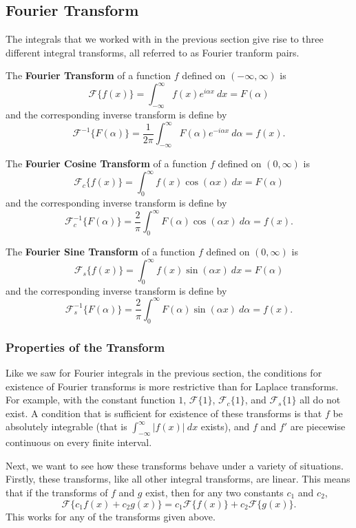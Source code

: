 \subsection{Fourier Transform}

The integrals that we worked with in the previous section give rise to three different integral transforms, all referred to as Fourier tranform pairs. 

\begin{definition}
The \textbf{Fourier Transform} of a function $f$ defined on $(-\infty, \infty)$ is
\[ \mathcal{F}\{f(x)\} = \int_{-\infty}^\infty f(x)e^{i\alpha x}\ dx = F(\alpha) \] and the corresponding inverse transform is define by 
\[ \mathcal{F}^{-1}\{F(\alpha)\} = \frac{1}{2\pi} \int_{-\infty}^\infty F(\alpha)e^{-i\alpha x}\ d\alpha = f(x). \]

The \textbf{Fourier Cosine Transform} of a function $f$ defined on $(0, \infty)$ is
\[ \mathcal{F}_c\{f(x)\} = \int_{0}^\infty f(x)\cos(\alpha x)\ dx = F(\alpha) \] and the corresponding inverse transform is define by 
\[ \mathcal{F}_c^{-1}\{F(\alpha)\} = \frac{2}{\pi} \int_{0}^\infty F(\alpha)\cos(\alpha x)\ d\alpha = f(x). \]

The \textbf{Fourier Sine Transform} of a function $f$ defined on $(0, \infty)$ is
\[ \mathcal{F}_s\{f(x)\} = \int_{0}^\infty f(x)\sin(\alpha x)\ dx = F(\alpha) \] and the corresponding inverse transform is define by 
\[ \mathcal{F}_s^{-1}\{F(\alpha)\} = \frac{2}{\pi} \int_{0}^\infty F(\alpha)\sin(\alpha x)\ d\alpha = f(x). \]
\end{definition}

\subsubsection{Properties of the Transform}

Like we saw for Fourier integrals in the previous section, the conditions for existence of Fourier transforms is more restrictive than for Laplace transforms. For example, with the constant function $1$, $\mathcal{F}\{1\}$, $\mathcal{F}_c\{1\}$, and $\mathcal{F}_s\{1\}$ all do not exist. A condition that is sufficient for existence of these transforms is that $f$ be absolutely integrable (that is $\int_{-\infty}^\infty |f(x)| \ dx$ exists), and $f$ and $f'$ are piecewise continuous on every finite interval. 

Next, we want to see how these transforms behave under a variety of situations. Firstly, these transforms, like all other integral transforms, are linear. This means that if the transforms of $f$ and $g$ exist, then for any two constants $c_1$ and $c_2$, 
\[ \mathcal{F}\{c_1f(x) + c_2g(x)\} = c_1\mathcal{F}\{f(x)\} + c_2 \mathcal{F}\{g(x)\}. \]
This works for any of the transforms given above.

